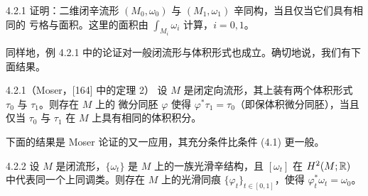 \begin{wexer}{4.2.1}
  证明：二维闭辛流形 $(M_0,\omega_0)$ 与 $(M_1,\omega_1)$ 辛同构，当且仅当它们具有相同的
  亏格与面积。这里的面积由 $\int_{M_i}\omega_i$ 计算，$i=0,1$。
\end{wexer}

同样地，例 4.2.1 中的论证对一般闭流形与体积形式也成立。确切地说，我们有下面结果。

\begin{wthm}{4.2.1}（Moser，[164] 中的定理 2）
  设 $M$ 是闭定向流形，其上装有两个体积形式 $\tau_0$ 与 $\tau_1$。则存在 $M$ 上的
  微分同胚 $\varphi$ 使得 $\varphi^*\tau_1=\tau_0$（即保体积微分同胚），当且仅当
  $\tau_0$ 与 $\tau_1$ 在 $M$ 上具有相同的体积积分。
\end{wthm}

下面的结果是 Moser 论证的又一应用，其充分条件比条件 (4.1) 更一般。

\begin{wthm}{4.2.2}
  设 $M$ 是闭流形，$\{\omega_t\}$ 是 $M$ 上的一族光滑辛结构，且 $[\omega_t]$ 在
  $H^2(M;\mathbb{R})$ 中代表同一个上同调类。则存在 $M$ 上的光滑同痕
  $\{\varphi_t\}_{t\in[0,1]}$，使得 $\varphi_t^*\omega_t=\omega_0$。
\end{wthm}

